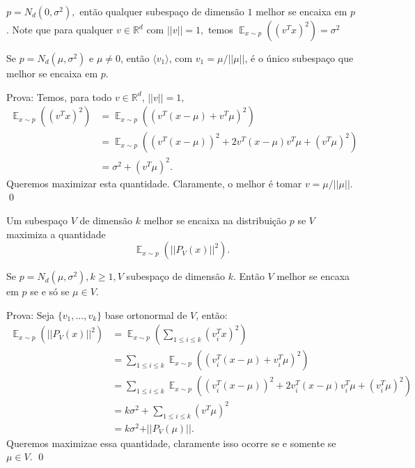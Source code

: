 \begin{exemplo}
$p = N_d(0,\sigma^2),$ ent\~ao qualquer subespa\c{c}o de dimens\~ao $1$ melhor se encaixa em $p$. Note que para qualquer $v\in \mathbb{R}^d$ com $\vert\vert v \vert\vert=1,$ temos  $\displaystyle \mathop{\mathbb{E}}_{x \sim p} \left((v^Tx)^2\right) = \sigma^2$
\end{exemplo}

\begin{lema}
Se $p = N_d(\mu,\sigma^2)$ e $\mu \neq 0$, ent\~ao $\langle v_1 \rangle$, com $v_1 = \mu/ \vert\vert \mu \vert \vert$, \'e o \'unico subespa\c{c}o que melhor se encaixa em $p$.
\end{lema}
Prova: Temos, para todo $v \in \mathbb{R}^d$, $\vert\vert v \vert \vert =1,$
\begin{align*}
\displaystyle \mathop{\mathbb{E}}_{x \sim p} \left((v^Tx)^2\right) &= \displaystyle \mathop{\mathbb{E}}_{x \sim p} \left((v^T(x-\mu) + v^T\mu)^2\right)\\
																   &= \displaystyle \mathop{\mathbb{E}}_{x \sim p} \left((v^T(x- \mu))^2 + 2v^T(x-\mu)v^T\mu + (v^T\mu)^2\right)\\
																   &= \sigma^2 + (v^T\mu)^2.			   
\end{align*}
Queremos maximizar esta quantidade. Claramente, o melhor \'e tomar $v = \mu/\vert\vert\mu\vert\vert$. \qed

\begin{definicao}
Um subespa\c{c}o $V$ de dimens\~ao $k$ melhor se encaixa na distribui\c{c}\~ao $p$ se $V$ maximiza a quantidade 
\[\displaystyle \mathop{\mathbb{E}}_{x \sim p} \left( \vert\vert P_V (x)\vert\vert^2\right).\]
\end{definicao}

\begin{lema}
Se $p = N_d(\mu, \sigma^2), k \ge 1, V$ subespa\c{c}o de dimens\~ao $k$. Ent\~ao $V$ melhor se encaxa em $p$ se e s\'o se $\mu \in V.$
\end{lema}

Prova: Seja $\{v_1,\dots,v_k\}$ base ortonormal de $V$, ent\~ao:
\begin{align*}
\displaystyle \mathop{\mathbb{E}}_{x \sim p} \left(\vert\vert P_V(x)\vert\vert^2\right) &= \displaystyle \mathop{\mathbb{E}}_{x \sim p} \left( \sum_{1\le i\le k} (v_i^Tx)^2\right)\\
																   &=\displaystyle \sum_{1\le i\le k}\mathop{\mathbb{E}}_{x \sim p} \left((v_i^T(x-\mu) + v_i^T\mu)^2\right)\\
																   &= \displaystyle \sum_{1\le i\le k}\mathop{\mathbb{E}}_{x \sim p} \left((v_i^T(x- \mu))^2 + 2v_i^T(x-\mu)v_i^T\mu + (v_i^T\mu)^2\right)\\
																   &= k\sigma^2 + \sum_{1\le i\le k}(v^T\mu)^2\\
																   &= k\sigma^2 + \vert\vert P_V(\mu)\vert\vert.			   
\end{align*}
Queremos maximizae essa quantidade, claramente isso ocorre se e somente se $\mu \in V$. \qed

